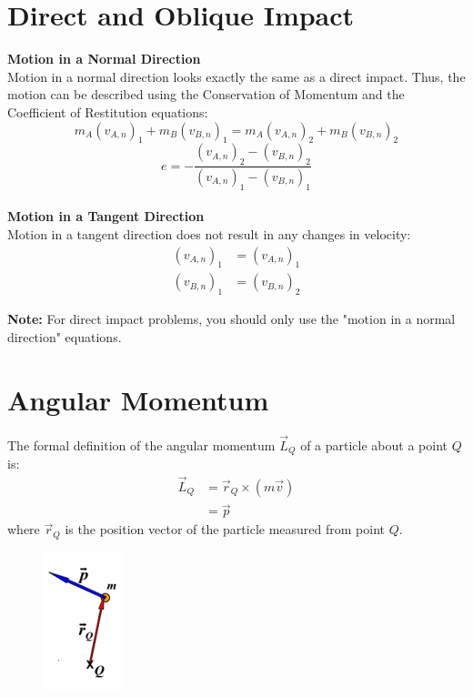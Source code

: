 \documentclass{article}
\begin{document}
\section*{Direct and Oblique Impact}

\textbf{Motion in a Normal Direction} \\
Motion in a normal direction looks exactly the same as a direct impact. Thus, the motion can be described using the Conservation of Momentum and the Coefficient of Restitution equations:
\begin{equation*}
    m_A \left(v_{A, n} \right)_1 + m_B \left( v_{B, n} \right)_1 = m_A \left(v_{A, n} \right)_2 + m_B \left( v_{B, n} \right)_2
\end{equation*}
\begin{equation*}
    e = -\frac{\left(v_{A, n} \right)_2 - \left( v_{B, n} \right)_2}{\left(v_{A, n} \right)_1 - \left( v_{B, n} \right)_1}
\end{equation*} \\

\textbf{Motion in a Tangent Direction} \\
Motion in a tangent direction does not result in any changes in velocity:
\begin{align*}
    \left(v_{A, n} \right)_1 &= \left(v_{A, n} \right)_1 \\
    \left(v_{B, n} \right)_1 &= \left(v_{B, n} \right)_2
\end{align*}

\textbf{Note:} For direct impact problems, you should only use the "motion in a normal direction" equations.

\clearpage


\section*{Angular Momentum}

The formal definition of the angular momentum $\vec{L}_Q$ of a particle about a point $Q$ is:
\begin{align*}
    \vec{L}_Q &= \vec{r}_Q \times \left( m \vec{v} \right) \\
              &= \vec{p}
\end{align*}
where $\vec{r}_Q$ is the position vector of the particle measured from point $Q$.

\begin{figure}[h]
    \includegraphics[scale=0.7]{angular_momentum_no_text}
    \centering
\end{figure}
\end{document}
